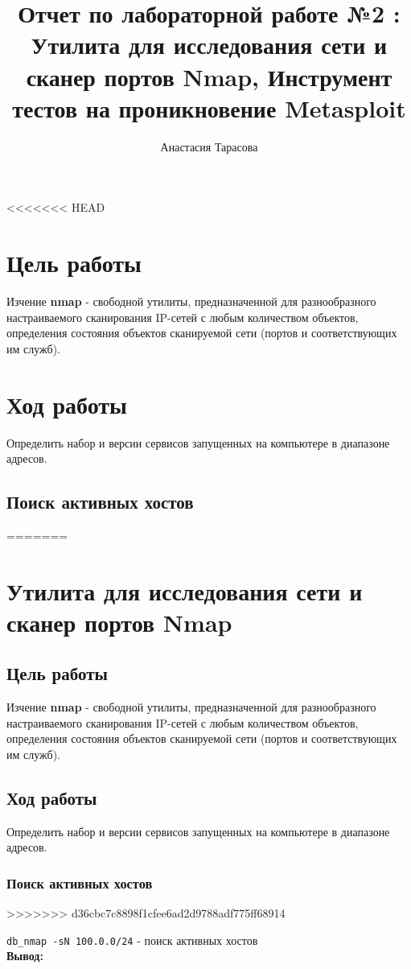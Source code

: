 \documentclass[12pt,a4paper]{article}
\author{Анастасия Тарасова}
\title{Отчет по лабораторной работе №2 :\\ Утилита для исследования сети и сканер портов Nmap, Инструмент тестов на проникновение Metasploit}
\begin{document}
\maketitle
<<<<<<< HEAD
\section{Цель работы}
Изчение \textbf{nmap} - свободной утилиты, предназначенной для разнообразного настраиваемого сканирования IP-сетей с любым количеством объектов, определения состояния объектов сканируемой сети (портов и соответствующих им служб).
\section{Ход работы}
Определить набор и версии сервисов запущенных на компьютере в диапазоне адресов.

\subsection{Поиск активных хостов}
=======
\section{Утилита для исследования сети и сканер портов Nmap}
\subsection{Цель работы}
Изчение \textbf{nmap} - свободной утилиты, предназначенной для разнообразного настраиваемого сканирования IP-сетей с любым количеством объектов, определения состояния объектов сканируемой сети (портов и соответствующих им служб).
\subsection{Ход работы}
Определить набор и версии сервисов запущенных на компьютере в диапазоне адресов.

\subsubsection{Поиск активных хостов}
>>>>>>> d36cbc7c8898f1cfee6ad2d9788adf775ff68914

\verb+db_nmap -sN 100.0.0/24+ - поиск активных хостов\\

\textbf{Вывод:}
\end{document}
